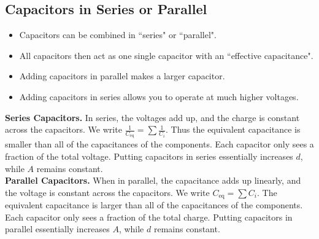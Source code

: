 \documentclass[class=article, crop=false]{standalone}
\begin{document}
  \subsection{Capacitors in Series or Parallel}
  \begin{itemize}
    \item Capacitors can be combined in ``series" or ``parallel".
    \item All capacitors then act as one single capacitor with an ``effective capacitance".
    \item Adding capacitors in parallel makes a larger capacitor.
    \item Adding capacitors in series allows you to operate at much higher voltages.
  \end{itemize}
  \textbf{Series Capacitors.} In series, the voltages add up, and the charge is constant across the capacitors. We write $\frac{1}{C_{\text{eq}}} = \sum \frac{1}{C_i}$. Thus the equivalent capacitance is smaller than all of the capacitances of the components. Each capacitor only sees a fraction of the total voltage. Putting capacitors in series essentially increases $d$, while $A$ remains constant. \\[10pt]
  \textbf{Parallel Capacitors.} When in parallel, the capacitance adds up linearly, and the voltage is constant across the capacitors. We write $C_{\text{eq}} = \sum C_i$. The equivalent capacitance is larger than all of the capacitances of the components. Each capacitor only sees a fraction of the total charge. Putting capacitors in parallel essentially increases $A$, while $d$ remains constant.
\end{document}
